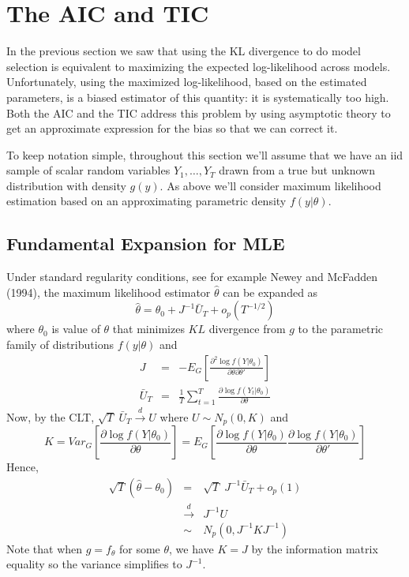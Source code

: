 \section{The AIC and TIC}
In the previous section we saw that using the KL divergence to do model selection is equivalent to maximizing the expected log-likelihood across models. Unfortunately, using the maximized log-likelihood, based on the estimated parameters, is a biased estimator of this quantity: it is systematically too high. Both the AIC and the TIC address this problem by using asymptotic theory to get an approximate expression for the bias so that we can correct it.

To keep notation simple, throughout this section we'll assume that we have an iid sample of scalar random variables $Y_1, \hdots, Y_T$ drawn from a true but unknown distribution with density $g(y)$. As above we'll consider maximum likelihood estimation based on an approximating parametric density $f(y|\theta)$.

\subsection{Fundamental Expansion for MLE}
Under standard regularity conditions, see for example Newey and McFadden (1994), the maximum likelihood estimator $\widehat{\theta}$ can be expanded as
$$\widehat{\theta} = \theta_0 + J^{-1} \bar{U}_T + o_p(T^{-1/2})$$
where $\theta_0$ is value of $\theta$ that minimizes $KL$ divergence from $g$ to the parametric family of distributions $f(y|\theta)$ and
\begin{eqnarray*}
J &=& -E_G \left[ \frac{\partial^2 \log f(Y|\theta_0)}{\partial \theta \partial \theta'}\right]\\
\bar{U}_T &=& \frac{1}{T} \sum_{t=1}^T \frac{\partial \log f(Y_t|\theta_0)}{\partial\theta}
\end{eqnarray*}
Now, by the CLT, $\sqrt{T}\; \bar{U}_T \overset{d}{\rightarrow} U$ where $U\sim N_p(0, K)$ and
$$K = Var_G \left[ \frac{\partial \log f(Y|\theta_0)}{\partial\theta}\right] = E_G\left[ \frac{\partial \log f(Y|\theta_0)}{\partial\theta} \frac{\partial \log f(Y|\theta_0)}{\partial\theta'}\right]$$
Hence,
\begin{eqnarray*}
\sqrt{T}\left(\widehat{\theta} - \theta_0 \right) &=& \sqrt{T} \; J^{-1} \bar{U}_T + o_p(1) \\
&\overset{d}{\rightarrow}& J^{-1} U\\
&\sim& N_p(0, J^{-1}KJ^{-1})
\end{eqnarray*}
Note that when $g = f_\theta$ for some $\theta$, we have $K = J$ by the information matrix equality so the variance simplifies to $J^{-1}$.


